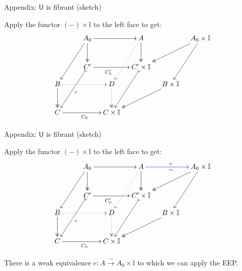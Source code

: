 \documentclass[handout]{beamer}
\newcommand{\U}{\mathsf{U}}
\newcommand{\II}{\mathbb{I}}
\theoremstyle{remark}
\begin{document}
\begin{frame}{Appendix: $\U$ is fibrant (sketch)}

Apply the functor $(-)\times\II$ to the left face to get:
%
\begin{equation*}
\begin{gathered}
\xymatrix@=1em{
&& \ar[llddd] A_0 \ar@{->>}[dd] \ar[rr]  &&  \ar@{..>}[lddd] A \ar@{->>}[dd] &&  \ar@{->>}[lldd] A_0\times\II \ar[lddd]  \\
&& && &&\\
&& \ar@{>->}[llddd]^c C' \ar[rr]_<<<<<<<<{C'_0}  &&  \ar@{>->}[lddd] C'\times\II && \\
B \ar@{->>}[dd] \ar@{..>}[rrr] &&& D \ar@{..>>}[dd] && \ar@{->>}[lldd] B\times\II &\\
&&&& &&\\
C \ar[rrr]_{C_0} &&& C\times\II &&&
}
\end{gathered}
\end{equation*}

\end{frame}
\begin{frame}{Appendix: $\U$ is fibrant (sketch)}

Apply the functor $(-)\times\II$ to the left face to get:
\begin{equation*}
\begin{gathered}
\xymatrix@=1em{
&& \ar[llddd] A_0 \ar@{->>}[dd] \ar[rr]  &&  \ar@{..>}[lddd] A \ar@{->>}[dd] \ar@[blue][rr]^e_{\sim} &&  \ar@{->>}[lldd] A_0\times\II \ar[lddd]  \\
&& && &&\\
&& \ar@{>->}[llddd]^c C' \ar[rr]_<<<<<<<<{C'_0}  &&   \ar@{>->}[lddd] C'\times\II && \\
B \ar@{->>}[dd] \ar@{..>}[rrr] &&& D \ar@{..>>}[dd] && \ar@{->>}[lldd] B\times\II &\\
&&&& &&\\
C \ar[rrr]_{C_0} &&& C\times\II &&&
}
\end{gathered}
\end{equation*}

There is a weak equivalence $e:A \xrightarrow{\sim} A_0\times \II$ to which we can apply the EEP.

\end{frame}
\end{document}

